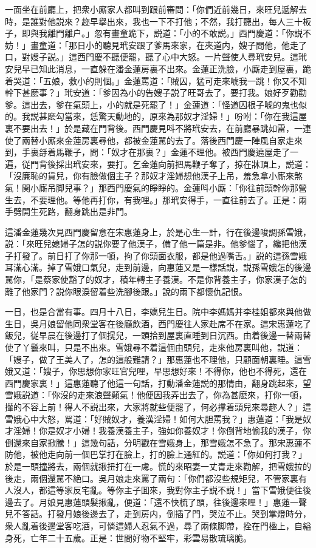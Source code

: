 一面坐在前廳上，把衆小廝家人都叫到跟前審問：「你們近前幾日，來旺兒遞解去時，是誰對他説來？趂早擧出來，我也一下不打他；不然，我打聽出，每人三十板子，即與我離門離户。」忽有畫童跪下，説道：「小的不敢説。」西門慶道：「你説不妨！」畫童道：「那日小的聽見玳安跟了爹馬來家，在夾道内，嫂子問他，他走了口，對嫂子説。」這西門慶不聽便罷，聽了心中大怒。一片聲使人尋玳安兒。這玳安兒早已知此消息，一直躲在潘金蓮房裏不出來。金蓮正洗臉，小廝走到屋裏，跪着哭道：「五娘，救小的則個。」金蓮罵道：「賊囚，猛可走來唬我一跳！你又不知幹下甚麽事？」玳安道：「爹因為小的告嫂子説了旺哥去了，要打我。娘好歹勸勸爹。這出去，爹在氣頭上，小的就是死罷了！」金蓮道：「怪道囚根子唬的鬼也似的。我説甚麽勾當來，恁驚天動地的，原來為那奴才淫婦！」吩咐：「你在我這屋裏不要出去！」於是藏在門背後。西門慶見呌不將玳安去，在前廳暴跳如雷，一連使了兩替小廝來金蓮房裏尋他，都被金蓮駡的去了。落後西門慶一陣風自家走來到，手裏㧱着馬鞭子，問：「奴才在那裏？」金蓮不理他。被西門慶遶屋走了一遍，従門背後採出玳安來，要打。乞金蓮向前把馬鞭子奪了，掠在牀頂上，説道：「沒廉恥的貨兒，你有臉做個主子？那奴才淫婦想他漢子上吊，羞急拿小廝來煞氣！関小廝吊脚兒事？」那西門慶氣的睜睜的。金蓮呌小廝：「你往前頭幹你那營生去，不要理他。等他再打你，有我哩。」那玳安得手，一直往前去了。正是：兩手劈開生死路，翻身跳出是非門。

這潘金蓮幾次見西門慶留意在宋惠蓮身上，於是心生一計，行在後邊唆調孫雪娥，説：「來旺兒媳婦子怎的説你要了他漢子，備了他一篇是非。他爹惱了，纔把他漢子打發了。前日打了你那一頓，拘了你頭面衣服，都是他過嘴舌。」説的這孫雪娥耳滿心滿。掉了雪娥口氣兒，走到前邊，向惠蓮又是一樣話説，説孫雪娥怎的後邊駡你，「是蔡家使豁了的奴才，積年轉主子養漢。不是你背養主子，你家漢子怎的離了他家門？説你眼淚留着些洗腳後跟。」說的兩下都懷仇記恨。

一日，也是合當有事。四月十八日，李嬌兒生日。院中李媽媽并李桂姐都來與他做生日，吳月娘留他同衆堂客在後廳飲酒，西門慶往人家赴席不在家。這宋惠蓮吃了飯兒，従早晨在後邊打了個㨪兒，一頭拾到屋裏直睡到日沉西。由着後邊一替兩替使了丫鬟來叫，只是不出來。雪娥尋不着這個由頭兒，走來他房裏叫他，説道：「嫂子，做了王美人了，怎的這般難請？」那惠蓮也不理他，只顧面朝裏睡。這雪娥又道：「嫂子，你思想你家旺官兒哩，早思想好來！不得你，他也不得死，還在西門慶家裏！」這惠蓮聽了他這一句話，打動潘金蓮説的那情由，翻身跳起來，望雪娥説道：「你沒的走來浪聲顙氣！他便因我弄出去了，你為甚麽來，打你一頓，攆的不容上前！得人不説出來，大家將就些便罷了，何必撑着頭兒來尋趂人？」這雪娥心中大怒，駡道：「好賊奴才，養漢淫婦！如何大胆罵我？」惠蓮道：「我是奴才淫婦！你是奴才小婦！我養漢養主子，強如你養奴才！你倒背地偷我的漢子，你倒還來自家掀騰！」這幾句話，分明戳在雪娥身上，那雪娥怎不急了。那宋惠蓮不防他，被他走向前一個巴掌打在臉上，打的臉上通紅的。説道：「你如何打我？」於是一頭撞將去，兩個就揪扭打在一䖏。慌的來昭妻一丈青走來勸解，把雪娥拉的後走，兩個還駡不絶口。吳月娘走來罵了兩句：「你們都沒些規矩兒，不管家裏有人沒人，都這等家反宅亂。等你主子囬來，我對你主子説不説！」當下雪娥便往後邊去了。月娘見惠蓮頭髮揪亂，便道：「還不快梳了頭，往後邊來哩！」惠蓮一聲兒不答話。打發月娘後邊去了，走到房内，倒插了門，哭泣不止。哭到掌燈時分，衆人亂着後邊堂客吃酒，可憐這婦人忍氣不過，尋了兩條脚帶，拴在門楹上，自縊身死，亡年二十五歲。正是：世間好物不堅牢，彩雲易散琉璃脆。

